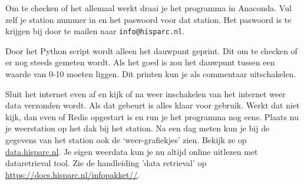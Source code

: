 Om te checken of het allemaal werkt draai je het programma in Anaconda. Vul zelf
je \hisparc station nummer in en het paswoord voor dat station. Het paswoord is te krijgen
bij \hisparc door te mailen naar \verb|info@hisparc.nl|.

Door het Python script wordt alleen het dauwpunt geprint. Dit om te checken
of er nog steeds gemeten wordt. Als het goed is zou het dauwpunt tussen
een waarde van 0-10 moeten liggen. Dit printen kun je als commentaar uitschakelen.

Sluit het internet even af en kijk of na weer inschakelen van het internet weer
data verzonden wordt. Als dat gebeurt is alles klaar voor gebruik.
Werkt dat niet kijk, dan even of Redis opgestart is en run je het programma
nog eens.
Plaats nu je weerstation op het dak bij het station. Na een dag meten kun je
bij de gegevens van het station ook de `weer-grafiekjes' zien. Bekijk ze op
\url{data.hisparc.nl}.
Je eigen weerdata kun je nu altijd online uitlezen met dataretrieval tool. Zie de handleiding
'data retrieval' op \url{https://docs.hisparc.nl/infopakket//}.



